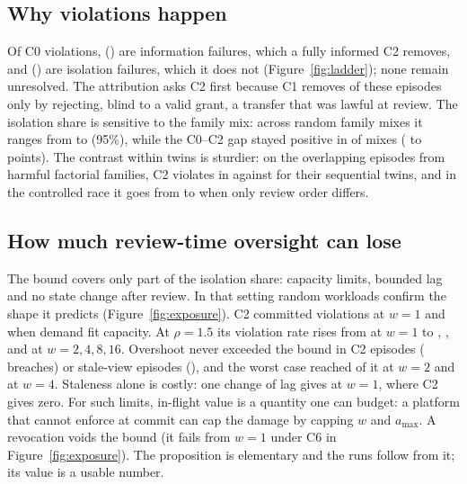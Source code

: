 \documentclass[10pt]{article}
\begin{document}
\subsection{Why violations happen}
Of \ladderTotal{} C0 violations, \ladderInformation{} (\ladderInformationPct{}) are information failures, which a fully informed C2 removes, and \ladderIsolation{} (\ladderIsolationPct{}) are isolation failures, which it does not (Figure~\ref{fig:ladder}); none remain unresolved. The attribution asks C2 first because C1 removes \ladderLucky{} of these episodes only by rejecting, blind to a valid grant, a transfer that was lawful at review. The isolation share is sensitive to the family mix: across \mixDraws{} random family mixes it ranges from \mixShareLo{} to \mixShareHi{} (95\%), while the C0--C2 gap stayed positive in \mixGapPositive{} of mixes (\mixGapLo{} to \mixGapHi{} points). The contrast within twins is sturdier: on the \concN{} overlapping episodes from harmful factorial families, C2 violates in \concCtwoOver{} against \concCtwoSeq{} for their sequential twins, and in the controlled race it goes from \raceCtwoSeq{} to \raceCtwoOver{} when only review order differs.



\subsection{How much review-time oversight can lose}
The bound covers only part of the isolation share: capacity limits, bounded lag and no state change after review. In that setting random workloads confirm the shape it predicts (Figure~\ref{fig:exposure}). C2 committed \wlSeqViol{} violations at $w=1$ and \wlUnderViol{} when demand fit capacity. At $\rho=1.5$ its violation rate rises from \wlCtwoWOne{} at $w=1$ to \wlCtwoWTwo{}, \wlCtwoWFour{}, \wlCtwoWEight{} and \wlCtwoWSixteen{} at $w=2,4,8,16$. Overshoot never exceeded the bound in \wlBoundCtwoN{} C2 episodes (\wlBoundCtwoBreach{} breaches) or \wlBoundCthreeN{} stale-view episodes (\wlBoundCthreeBreach{}), and the worst case reached \wlTightWTwo{} of it at $w=2$ and \wlTightWFour{} at $w=4$. Staleness alone is costly: one change of lag gives \wlCthreeWOne{} at $w=1$, where C2 gives zero. For such limits, in-flight value is a quantity one can budget: a platform that cannot enforce at commit can cap the damage by capping $w$ and $a_{\max}$. A revocation voids the bound (it fails from $w=1$ under C6 in Figure~\ref{fig:exposure}). The proposition is elementary and the runs follow from it; its value is a usable number.
\end{document}
